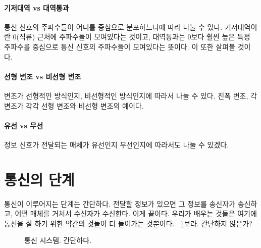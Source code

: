 \paragraph{기저대역 vs 대역통과} 통신 신호의 주파수들이 어디를 중심으로 분포하느냐에 따라 나눌 수 있다.
기저대역이란 0(직류) 근처에 주파수들이 모여있다는 것이고, 대역통과는 0보다 훨씬 높은 특정 주파수를 중심으로 통신 신호의 주파수들이 모여있다는 뜻이다.
이 또한 살펴볼 것이다.
\paragraph{선형 변조 vs 비선형 변조} 변조가 선형적인 방식인지, 비선형적인 방식인지에 따라서 나눌 수 있다. 진폭 변조, 각 변조가 각각 선형 변조와 비선형 변조의 예이다.
\paragraph{유선 vs 무선} 정보 신호가 전달되는 매체가 유선인지 무선인지에 따라서도 나눌 수 있겠다.

\section{통신의 단계}
통신이 이루어지는 단계는 간단하다. 전달할 정보가 있으면 그 정보를 송신자가 송신하고, 어떤 매체를 거쳐서 수신자가 수신한다. 이게 끝이다.
우리가 배우는 것들은 여기에 통신을 잘 하기 위한 약간의 것들이 더 들어가는 것뿐이다. \figurename~\ref{fig:comm system}\을 보라. 간단하지 않은가?
\begin{figure}[!hbp]
    \centering
    \caption{통신 시스템. 간단하다.}\label{fig:comm system}
\end{figure}
